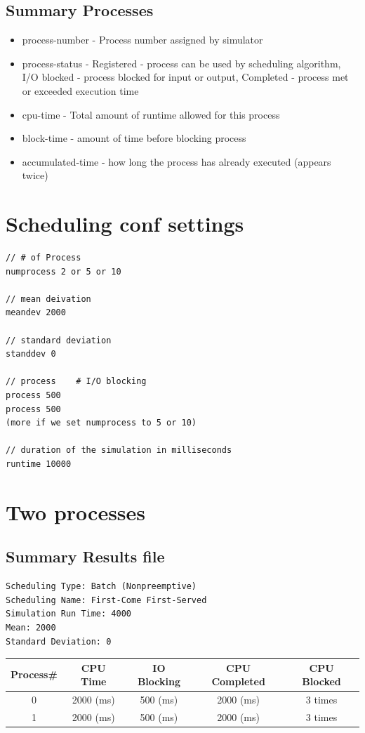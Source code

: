 \documentclass{article}
\begin{document}
\subsection{Summary Processes} 
\begin{itemize}
	\item process-number - Process number assigned by simulator
	\item process-status - Registered - process can be used by scheduling
		algorithm, I/O blocked - process blocked for input or output,
		Completed - process met or exceeded execution time
	\item cpu-time - Total amount of runtime allowed for this process
	\item block-time - amount of time before blocking process
	\item accumulated-time - how long the process has already executed
		(appears twice)
\end{itemize}
\cite{lab3 Manual}

\section{Scheduling conf settings}
\begin{lstlisting}
// # of Process	
numprocess 2 or 5 or 10

// mean deivation
meandev 2000

// standard deviation
standdev 0

// process    # I/O blocking
process 500
process 500
(more if we set numprocess to 5 or 10)

// duration of the simulation in milliseconds
runtime 10000

\end{lstlisting}

\section{Two processes}
\subsection{Summary Results file}


\begin{lstlisting}
Scheduling Type: Batch (Nonpreemptive)
Scheduling Name: First-Come First-Served
Simulation Run Time: 4000
Mean: 2000
Standard Deviation: 0
\end{lstlisting}

\begin{center}
\begin{tabular}{| c | c | c | c | c |}
\hline
Process\# &	CPU Time &	IO Blocking & CPU Completed & CPU Blocked \\
\hline
0&		2000 (ms)&	500 (ms)&	2000 (ms)&	3 times \\
\hline
1&		2000 (ms)&	500 (ms)&	2000 (ms)&	3 times \\
\hline
\end{tabular}
\end{center}
\end{document}
